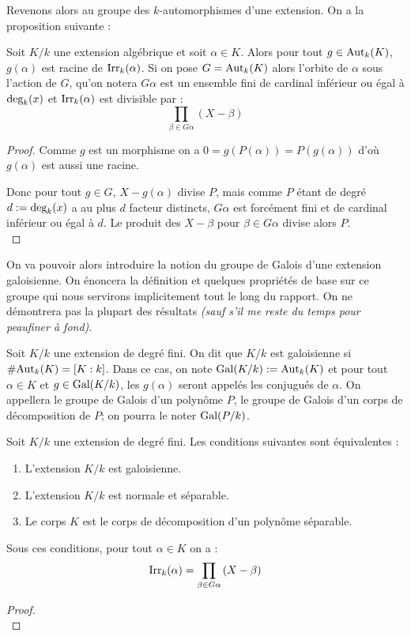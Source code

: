 \documentclass[a4paper]{article} %
\numberwithin{section}{part}
\numberwithin{equation}{section}
\newcommand\Irr[2]{\textup{Irr}_{#1}(#2)}
\begin{document}
Revenons alors au groupe des $k$-automorphismes d'une extension. On a la
proposition suivante :

\begin{prop}
Soit $K/k$ une extension algébrique et soit $\alpha\in K$. Alors pour tout
$g\in\textup{Aut}_k(K)$, $g(\alpha)$ est racine de $\Irr{k}{\alpha}$. Si on
pose $G = \textup{Aut}_k(K)$ alors l'orbite de $\alpha$ sous l'action de $G$,
qu'on notera $G\alpha$ est un ensemble fini de cardinal inférieur ou égal à
$\textup{deg}_k(x)$ et $\Irr{k}{\alpha}$ est divisible par :
\[\prod_{\beta\in G\alpha}{(X - \beta)}\]
\end{prop}
\begin{proof}
Comme $g$ est un morphisme on a $0 = g(P(\alpha)) = P(g(\alpha))$ d'où
$g(\alpha)$ est aussi une racine.\par
Donc pour tout $g\in G$, $X - g(\alpha)$ divise $P$, mais comme $P$ étant de
degré $d := \textup{deg}_k(x)$ a au plus $d$ facteur distincts, $G\alpha$ est 
forcément fini et de cardinal inférieur ou égal à $d$. Le produit des $X -
\beta$ pour $\beta\in G\alpha$ divise alors $P$.\\
\end{proof}

On va pouvoir alors introduire la notion du groupe de Galois d'une extension
galoisienne. On énoncera la définition et quelques propriétés de base sur ce
groupe qui nous servirons implicitement tout le long du rapport. On ne
démontrera pas la plupart des résultats \textit{(sauf s'il me reste du temps
pour peaufiner à fond)}. 

\begin{defn}
\label{defgal}
Soit $K/k$ une extension de degré fini. On dit que $K/k$ est galoisienne si
$\#\textup{Aut}_k(K) = [K:k]$. Dans ce cas, on note $\textup{Gal}(K/k) :=
\textup{Aut}_k(K)$ et pour tout $\alpha\in K$ et $g\in\textup{Gal}(K/k)$, les
$g(\alpha)$ seront appelés les conjugués de $\alpha$.
On appellera le groupe de Galois d'un polynôme $P$, le groupe de Galois d'un
corps de décomposition de $P$; on pourra le noter $\textup{Gal}(P/k)$.
\end{defn}

\begin{thm}
Soit $K/k$ une extension de degré fini. Les conditions suivantes sont
équivalentes :
\begin{enumerate}
\item L'extension $K/k$ est galoisienne.
\item L'extension $K/k$ est normale et séparable.
\item Le corps $K$ est le corps de décomposition d'un polynôme séparable.
\end{enumerate}
Sous ces conditions, pour tout $\alpha\in K$ on a :
\[\Irr{k}{\alpha} = \prod_{\beta\in G\alpha}{(X - \beta)}\]
\end{thm}
\begin{proof}
\cite[Chap. VIII, p.~169]{Pol}\\
\end{proof}
\end{document}
